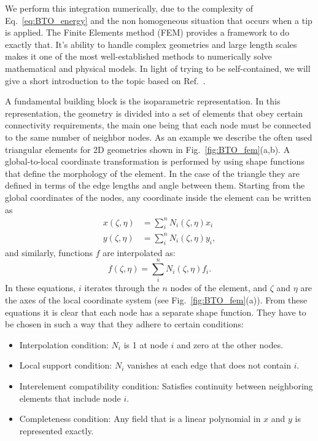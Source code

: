 We perform this integration numerically, due to the complexity of Eq.~\ref{eq:BTO_energy} and the non homogeneous situation that occurs when a tip is applied.
The Finite Elements method (FEM) provides a framework to do exactly that.
It's ability to handle complex geometries and large length scales makes it one of the most well-established methods to numerically solve mathematical and physical models.
In light of trying to be self-contained, we will give a short introduction to the topic based on Ref.~\cite{Biner}.

A fundamental building block is the isoparametric representation.
In this representation, the geometry is divided into a set of elements that obey certain connectivity requirements, the main one being that each node must be connected to the same number of neighbor nodes.
As an example we describe the often used triangular elements for 2D geometries shown in Fig.~\ref{fig:BTO_fem}(a,b).
A global-to-local coordinate transformation is performed by using shape functions that define the morphology of the element.
In the case of the triangle they are defined in terms of the edge lengths and angle between them. 
Starting from the global coordinates of the nodes, any coordinate inside the element can be written as
\begin{align}
x(\zeta, \eta) &= \sum_i^n N_i(\zeta, \eta) x_i\\
y(\zeta, \eta) &= \sum_i^n N_i(\zeta, \eta) y_i,
\end{align}
and similarly, functions $f$ are interpolated as:
\begin{equation}
	\label{eq:BTO_funcinterp}
	f(\zeta, \eta) = \sum_i^n N_i(\zeta, \eta) f_i.
\end{equation}
In these equations, $i$ iterates through the $n$ nodes of the element, and $\zeta$ and $\eta$ are the axes of the local coordinate system (see Fig.~\ref{fig:BTO_fem}(a)).
From these equations it is clear that each node has a separate shape function.
They have to be chosen in such a way that they adhere to certain conditions:
\begin{itemize}
	\item Interpolation condition: $N_i$ is 1 at node $i$ and zero at the other nodes.
	\item Local support condition: $N_i$ vanishes at each edge that does not contain $i$.
	\item Interelement compatibility condition: Satisfies continuity between neighboring elements that include node $i$.
	\item Completeness condition: Any field that is a linear polynomial in $x$ and $y$ is represented exactly.
\end{itemize}

